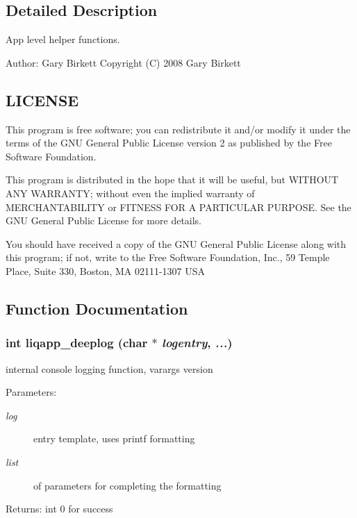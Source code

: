 \label{_details}
\subsection{Detailed Description}
App level helper functions. 

\begin{Desc}
\item[Author:]Gary Birkett Copyright (C) 2008 Gary Birkett\end{Desc}
\subsection{LICENSE}\label{d7/db4/liqcell__prop_8c_LICENSE}
This program is free software; you can redistribute it and/or modify it under the terms of the GNU General Public License version 2 as published by the Free Software Foundation.

This program is distributed in the hope that it will be useful, but WITHOUT ANY WARRANTY; without even the implied warranty of MERCHANTABILITY or FITNESS FOR A PARTICULAR PURPOSE. See the GNU General Public License for more details.

You should have received a copy of the GNU General Public License along with this program; if not, write to the Free Software Foundation, Inc., 59 Temple Place, Suite 330, Boston, MA 02111-1307 USA 

\subsection{Function Documentation}
\subsubsection[{liqapp\_\-deeplog}]{\setlength{\rightskip}{0pt plus 5cm}int liqapp\_\-deeplog (char $\ast$ {\em logentry}, \/   {\em ...})}\label{d7/dbc/liqapp_8c_8f60c7ad37bab70f29be7c4f76581e7c}


internal console logging function, varargs version \begin{Desc}
\item[Parameters:]
\begin{description}
\item[{\em log}]entry template, uses printf formatting \item[{\em list}]of parameters for completing the formatting \end{description}
\end{Desc}
\begin{Desc}
\item[Returns:]int 0 for success \end{Desc}


